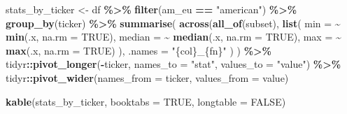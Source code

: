 \documentclass[
]{article}
\newenvironment{Shaded}{\begin{snugshade}}{\end{snugshade}}
\newcommand{\AttributeTok}[1]{\textcolor[rgb]{0.13,0.29,0.53}{#1}}
\newcommand{\ConstantTok}[1]{\textcolor[rgb]{0.56,0.35,0.01}{#1}}
\newcommand{\FunctionTok}[1]{\textcolor[rgb]{0.13,0.29,0.53}{\textbf{#1}}}
\newcommand{\NormalTok}[1]{#1}
\newcommand{\OtherTok}[1]{\textcolor[rgb]{0.56,0.35,0.01}{#1}}
\newcommand{\SpecialCharTok}[1]{\textcolor[rgb]{0.81,0.36,0.00}{\textbf{#1}}}
\newcommand{\StringTok}[1]{\textcolor[rgb]{0.31,0.60,0.02}{#1}}
\begin{document}
\begin{Shaded}
\begin{Highlighting}[]
\NormalTok{stats\_by\_ticker }\OtherTok{\textless{}{-}}\NormalTok{ df }\SpecialCharTok{\%\textgreater{}\%}
  \FunctionTok{filter}\NormalTok{(am\_eu }\SpecialCharTok{==} \StringTok{"american"}\NormalTok{) }\SpecialCharTok{\%\textgreater{}\%}
  \FunctionTok{group\_by}\NormalTok{(ticker) }\SpecialCharTok{\%\textgreater{}\%}
  \FunctionTok{summarise}\NormalTok{(}
    \FunctionTok{across}\NormalTok{(}\FunctionTok{all\_of}\NormalTok{(subset),}
      \FunctionTok{list}\NormalTok{(}
        \AttributeTok{min =} \SpecialCharTok{\textasciitilde{}} \FunctionTok{min}\NormalTok{(.x, }\AttributeTok{na.rm =} \ConstantTok{TRUE}\NormalTok{),}
        \AttributeTok{median =} \SpecialCharTok{\textasciitilde{}} \FunctionTok{median}\NormalTok{(.x, }\AttributeTok{na.rm =} \ConstantTok{TRUE}\NormalTok{),}
        \AttributeTok{max =} \SpecialCharTok{\textasciitilde{}} \FunctionTok{max}\NormalTok{(.x, }\AttributeTok{na.rm =} \ConstantTok{TRUE}\NormalTok{)}
\NormalTok{      ),}
      \AttributeTok{.names =} \StringTok{"\{col\}\_\{fn\}"}
\NormalTok{    )}
\NormalTok{  ) }\SpecialCharTok{\%\textgreater{}\%}
\NormalTok{  tidyr}\SpecialCharTok{::}\FunctionTok{pivot\_longer}\NormalTok{(}\SpecialCharTok{{-}}\NormalTok{ticker, }\AttributeTok{names\_to =} \StringTok{"stat"}\NormalTok{, }\AttributeTok{values\_to =} \StringTok{"value"}\NormalTok{) }\SpecialCharTok{\%\textgreater{}\%}
\NormalTok{  tidyr}\SpecialCharTok{::}\FunctionTok{pivot\_wider}\NormalTok{(}\AttributeTok{names\_from =}\NormalTok{ ticker, }\AttributeTok{values\_from =}\NormalTok{ value)}

\FunctionTok{kable}\NormalTok{(stats\_by\_ticker, }\AttributeTok{booktabs =} \ConstantTok{TRUE}\NormalTok{, }\AttributeTok{longtable =} \ConstantTok{FALSE}\NormalTok{)}
\end{Highlighting}
\end{Shaded}
\end{document}
